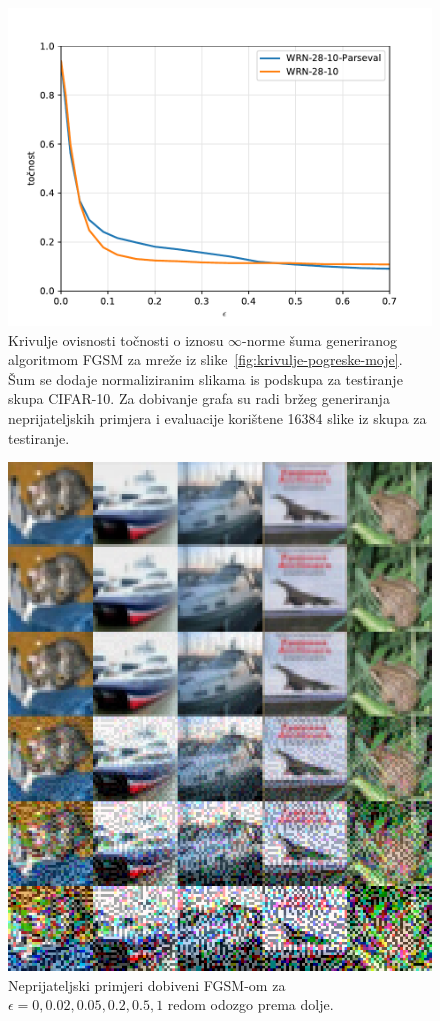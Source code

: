 \documentclass[utf8, seminar, numeric, lmodern]{feri}
\begin{document}
\begin{figure}[htbp]
	\centering
	\includegraphics[width=1\linewidth]{ilustracije/grafovi/otpornost}
	\caption{
		Krivulje ovisnosti točnosti o iznosu $\infty$-norme šuma generiranog algoritmom FGSM za mreže iz slike~\ref{fig:krivulje-pogreske-moje}. Šum se dodaje normaliziranim slikama is podskupa za testiranje skupa CIFAR-10. Za dobivanje grafa su radi bržeg generiranja neprijateljskih primjera i evaluacije korištene 16384 slike iz skupa za testiranje.
	}
	\label{fig:krivulje-otpornosti}
\end{figure}

\begin{figure}[htbp]
	\centering
	\includegraphics[width=0.6\linewidth]{ilustracije/slike/np-eps025251}
	\caption{
		Neprijateljski primjeri dobiveni FGSM-om za $\epsilon=0,0.02,0.05,0.2,0.5,1$ redom odozgo prema dolje.
	}
	\label{fig:neprijateljski-primjeri}
\end{figure}
\end{document}
